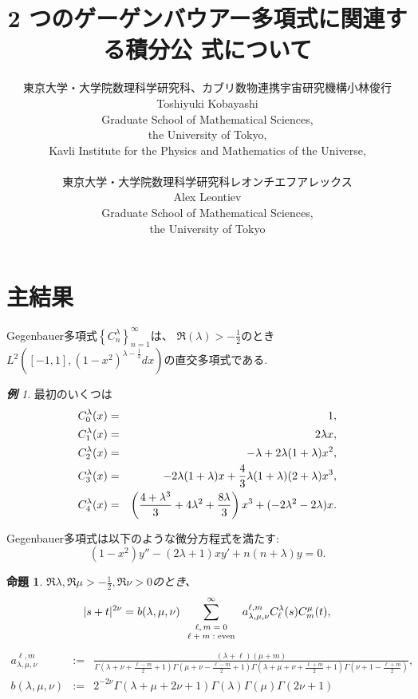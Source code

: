 \documentclass[12pt]{article} %
\title{2 つのゲーゲンバウアー多項式に関連する積分公 式について}
\author{東京大学・大学院数理科学研究科、カブリ数物連携宇宙研究機構\quad 小林\quad 俊行\\
Toshiyuki Kobayashi\\
Graduate School of Mathematical Sciences,\\
the University of Tokyo,\\
Kavli Institute for the Physics and Mathematics of the Universe,\\\\
東京大学・大学院数理科学研究科\quad レオンチエフ\quad アレックス\\
Alex Leontiev\\
Graduate School of Mathematical Sciences,\\
the University of Tokyo
}
\date{} %
\newtheorem{prop}{命題}
\theoremstyle{remark}
\newtheorem*{example*}{\textbf{例}}
\newcommand{\tmop}[1]{\ensuremath{\operatorname{#1}}}
\begin{document}
\maketitle

\section{主結果}
	Gegenbauer多項式$\left\{ C_n^\lambda \right\}_{n=1}^{\infty}$は、
	$\Re(\lambda)>-\frac{1}{2}$のとき$L^2\left( [-1,1],(1-x^2)^{\lambda-\frac{1}{2}}dx \right)$の直交多項式である.
	\vspace{-0.2cm}
	\begin{example*}
		最初のいくつは
	\vspace{-0.3cm}
		\begin{eqnarray*}
	\vspace{-0.2cm}
			C_0^\lambda(x)&=&1,\\
			C_1^\lambda(x)&=&2\lambda x,\\
			C_2^\lambda(x)&=&-\lambda+2\lambda(1+\lambda)x^2,\\
			C_3^\lambda(x)&=&-2\lambda(1+\lambda)x+\frac{4}{3}\lambda(1+\lambda)(2+\lambda)x^3,\\
			C_4^\lambda(x)&=&\left(\frac{4+\lambda^3}{3}+4\lambda^2+\frac{8\lambda}{3}  \right)x^3+(-2\lambda^2-2\lambda)x.
		\end{eqnarray*}
	\end{example*}
	Gegenbauer多項式は以下のような微分方程式を満たす:
		\vspace{-0.2cm}
	\begin{equation*}
		(1-x^2)y''-(2\lambda+1)xy'+n(n+\lambda)y=0.
	\end{equation*}
	\begin{prop}\label{prop:exp-st-gg}
		$\Re\lambda,\Re\mu>-\frac{1}{2},\Re\nu>0$のとき、
		\begin{equation}
			| s + t |^{2 \nu} =b(\lambda,\mu,\nu) \sum_{\mbox{\scriptsize $\begin{array}[]{c}
			\ell, m = 0 \\ \ell + m : \tmop{even}
		\end{array}$}}^{\infty} a_{\lambda,\mu,\nu}^{\ell,m} C_\ell^{\lambda} (s) C_m^{\mu} (t),
			\label{eqn:exp-st-gg}
		\end{equation}
		{
			\begin{equation*}
				\begin{array}{rcl}
	a_{\lambda,\mu,\nu}^{\ell,m}&:=&\frac{ (\lambda + \ell) (\mu + m)   }{\Gamma \left( \lambda + \nu + \frac{\ell -
	  m}{2} + 1 \right)  \Gamma \left( \mu + \nu -
	  \frac{\ell - m}{2} + 1 \right)\Gamma \left( \lambda + \mu + \nu + \frac{\ell +
	  m}{2} + 1 \right)\Gamma\left(  \nu+1-\frac{\ell+m}{2}\right)},\\[0.4cm]
	  b(\lambda,\mu,\nu)&:=&2^{-2\nu}\Gamma (\lambda + \mu + 2 \nu + 1){\Gamma (\lambda)
	  \Gamma (\mu)\Gamma \left( 2\nu +
	1 \right)}
			\end{array}
			\end{equation*}
	}
	\end{prop}
\end{document}
